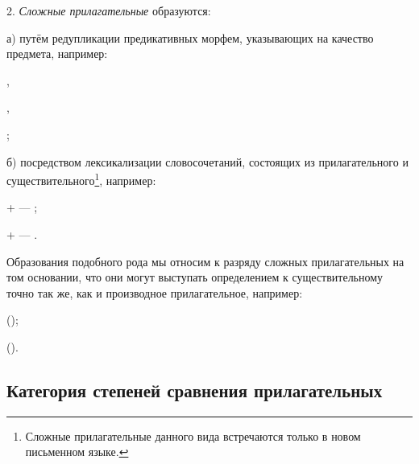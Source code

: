 2. \emph{Сложные прилагательные} образуются:

а) путём редупликации предикативных морфем, указывающих на качество предмета, например:
\begin{prfsample}
    \item {},
    \item {},
    \item {};
\end{prfsample}

б) посредством лексикализации словосочетаний, состоящих из прилагательного и существительного\footnote[28]{Сложные прилагательные данного вида встречаются только в новом письменном языке.}, например:
\begin{prfsample}
    \item {} +  --- ;
    \item {} +  --- .
\end{prfsample}
Образования подобного рода мы относим к разряду сложных прилагательных на том основании, что они могут выступать определением к существительному точно так же, как и производное прилагательное, например:
\begin{prfsample}
    \item {} ();
    \item {} ().
\end{prfsample}

\subsection{Категория степеней сравнения прилагательных}\label{sec:prilagatelnoe:kat_step_srav}

